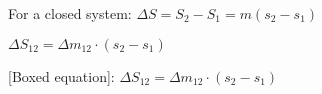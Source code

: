 For a closed system:  
\( \Delta S = S_2 - S_1 = m (s_2 - s_1) \)  

\( \Delta S_{12} = \Delta m_{12} \cdot (s_2 - s_1) \)  

[Boxed equation]: \( \Delta S_{12} = \Delta m_{12} \cdot (s_2 - s_1) \)